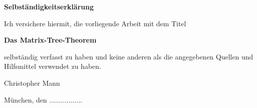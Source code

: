 \documentclass[11pt,a4paper,twoside]{article}
\begin{document}
\vspace*{1cm}
{\huge \textbf{Selbständigkeitserklärung}}\\
\vspace*{1.5cm}

Ich versichere hiermit, die vorliegende Arbeit mit dem Titel

\begin{center}
	\textbf{Das Matrix-Tree-Theorem}
\end{center}

selbständig verfasst zu haben und keine anderen als die angegebenen Quellen und Hilfsmittel verwendet zu haben.

\vspace*{3cm}

Christopher Mann

\vspace*{1cm}
München, den .................
\end{document}

